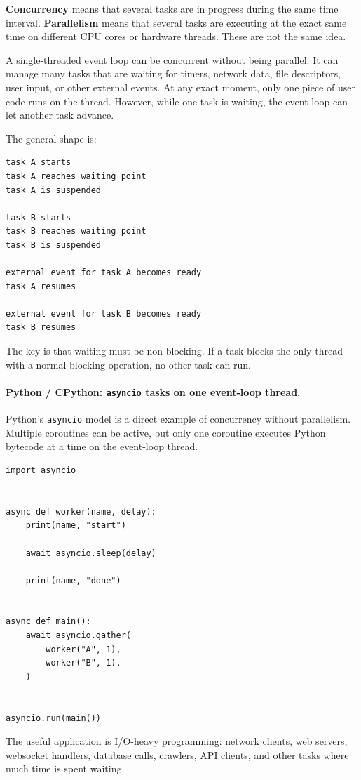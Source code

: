 \textbf{Concurrency} means that several tasks are in progress during the same time interval. \textbf{Parallelism} means that several tasks are executing at the exact same time on different CPU cores or hardware threads. These are not the same idea.

A single-threaded event loop can be concurrent without being parallel. It can manage many tasks that are waiting for timers, network data, file descriptors, user input, or other external events. At any exact moment, only one piece of user code runs on the thread. However, while one task is waiting, the event loop can let another task advance.

The general shape is:

\begin{verbatim}
task A starts
task A reaches waiting point
task A is suspended

task B starts
task B reaches waiting point
task B is suspended

external event for task A becomes ready
task A resumes

external event for task B becomes ready
task B resumes
\end{verbatim}

The key is that waiting must be non-blocking. If a task blocks the only thread with a normal blocking operation, no other task can run.

\paragraph{Python / CPython: \texttt{asyncio} tasks on one event-loop thread.}

Python's \texttt{asyncio} model is a direct example of concurrency without parallelism. Multiple coroutines can be active, but only one coroutine executes Python bytecode at a time on the event-loop thread.

\begin{verbatim}
import asyncio


async def worker(name, delay):
    print(name, "start")

    await asyncio.sleep(delay)

    print(name, "done")


async def main():
    await asyncio.gather(
        worker("A", 1),
        worker("B", 1),
    )


asyncio.run(main())
\end{verbatim}

The useful application is I/O-heavy programming: network clients, web servers, websocket handlers, database calls, crawlers, API clients, and other tasks where much time is spent waiting.


